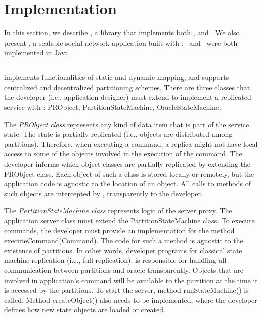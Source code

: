 \section{Implementation}
\label{sec:implementation}

In this section, we describe \libname{}, a library that implements both \ssmr{}, \dssmr{} and \dynastar{}.
We also present \appname{}, a scalable social network application built with \libname{}. \libname\ and \appname\ were both implemented in Java.

\subsection{\libname}

\libname{} implements functionalities of static and dynamic mapping, and supports centralized and decentralized partitioning schemes. 
There are three classes that the developer (i.e., application designer) must extend to implement a replicated service with \libname{}: PRObject, 
PartitionStateMachine, OracleStateMachine.

The \emph{PRObject class} represents any kind of data item that is part of the service state. The state is partially replicated (i.e., 
objects are distributed among partitions). Therefore, when executing a command, a 
replica might not have local access to some of the objects involved in the execution of the command. The developer informs \libname{} which 
object classes are partially replicated by extending the PRObject class. Each object of such a class is stored locally or remotely, but 
the application code is agnostic to the location of an object. All calls to methods of such objects are intercepted by \libname{}, transparently to the developer. 

The \emph{PartitionStateMachine class} represents logic of the server proxy. The application server class must extend the 
PartitionStateMachine class. To execute commands, the developer must provide an implementation for the method executeCommand(Command). The code 
for such a method is agnostic to the existence of partitions. In other words, developer programs for classical state machine replication (i.e., full replication). \libname{} is responsible for handling all communication between partitions 
and oracle transparently. Objects that are involved in application's command will be available to the partition at the time it is accessed by the partitions. To start the server, method runStateMachine() is called. Method createObject() also needs to be implemented, where the 
developer defines how new state objects are loaded or created.


